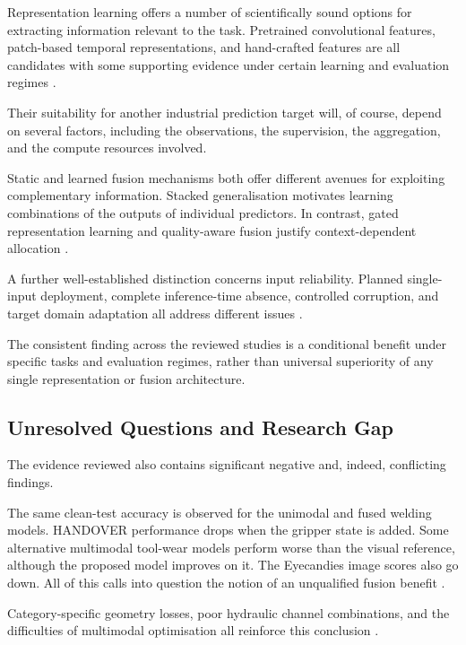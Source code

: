 Representation learning offers a number of scientifically sound options for extracting information
relevant to the task. Pretrained convolutional features, patch-based temporal representations, and
hand-crafted features are all candidates with some supporting evidence under certain learning and
evaluation regimes \citep{Roth2022Towards,Nie2023PatchTST,Horwitz2023Back}.

Their suitability for another industrial prediction target will, of course, depend on several
factors, including the observations, the supervision, the aggregation, and the compute resources
involved.

Static and learned fusion mechanisms both offer different avenues for exploiting complementary
information. Stacked generalisation motivates learning combinations of the outputs of individual
predictors. In contrast, gated representation learning and quality-aware fusion justify
context-dependent allocation \citep{Ting1999Issues,P006,Zhang2023QMF}.

A further well-established distinction concerns input reliability. Planned single-input deployment,
complete inference-time absence, controlled corruption, and target domain adaptation all address
different issues \citep{Li2025PGMTKD,Altinses2023Fuzzy,P051}.

The consistent finding across the reviewed studies is a conditional benefit under specific tasks and
evaluation regimes, rather than universal superiority of any single representation or fusion
architecture.

\subsection{Unresolved Questions and Research Gap}

The evidence reviewed also contains significant negative and, indeed, conflicting findings.

The same clean-test accuracy is observed for the unimodal and fused welding models. HANDOVER
performance drops when the gripper state is added. Some alternative multimodal tool-wear models
perform worse than the visual reference, although the proposed model improves on it. The Eyecandies
image scores also go down. All of this calls into question the notion of an unqualified fusion
benefit \citep{Hua2026Weld,Thoduka2024Handover,P045,P033}.

Category-specific geometry losses, poor hydraulic channel combinations, and the difficulties of
multimodal optimisation all reinforce this conclusion
\citep{Horwitz2023Back,Bonfiglioli2023The,Goodarzi2023Deep,Wang2020What}.

